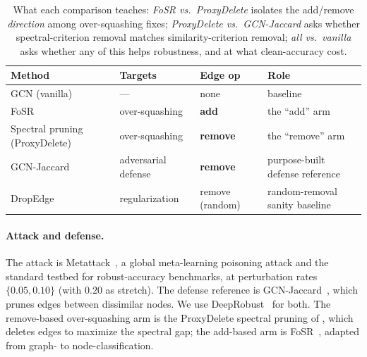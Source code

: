 \documentclass[10pt]{article}
\begin{document}
\begin{table}[h]
\centering
\small
\begin{tabular}{@{}llll@{}}
\toprule
\textbf{Method} & \textbf{Targets} & \textbf{Edge op} & \textbf{Role} \\
\midrule
GCN (vanilla)               & ---                 & none   & baseline \\
FoSR                        & over-squashing      & \textbf{add}    & the ``add'' arm \\
Spectral pruning (ProxyDelete) & over-squashing   & \textbf{remove} & the ``remove'' arm \\
GCN-Jaccard                 & adversarial defense & \textbf{remove} & purpose-built defense reference \\
DropEdge                    & regularization      & remove (random) & random-removal sanity baseline \\
\bottomrule
\end{tabular}
\caption{What each comparison teaches: \emph{FoSR vs.\ ProxyDelete} isolates the add/remove
\emph{direction} among over-squashing fixes; \emph{ProxyDelete vs.\ GCN-Jaccard} asks whether
spectral-criterion removal matches similarity-criterion removal; \emph{all vs.\ vanilla} asks whether
any of this helps robustness, and at what clean-accuracy cost.}
\end{table}

\paragraph{Attack and defense.} The attack is Metattack~\citep{zugner2019metattack}, a global
meta-learning poisoning attack and the standard testbed for robust-accuracy benchmarks, at perturbation
rates $\{0.05, 0.10\}$ (with $0.20$ as stretch). The defense reference is
GCN-Jaccard~\citep{wu2019jaccard}, which prunes edges between dissimilar nodes. We use
DeepRobust~\citep{li2021deeprobust} for both. The remove-based over-squashing arm is the ProxyDelete
spectral pruning of \citet{jamadandi2024spectral}, which deletes edges to maximize the spectral gap;
the add-based arm is FoSR~\citep{karhadkar2023fosr}, adapted from graph- to node-classification.
\end{document}
